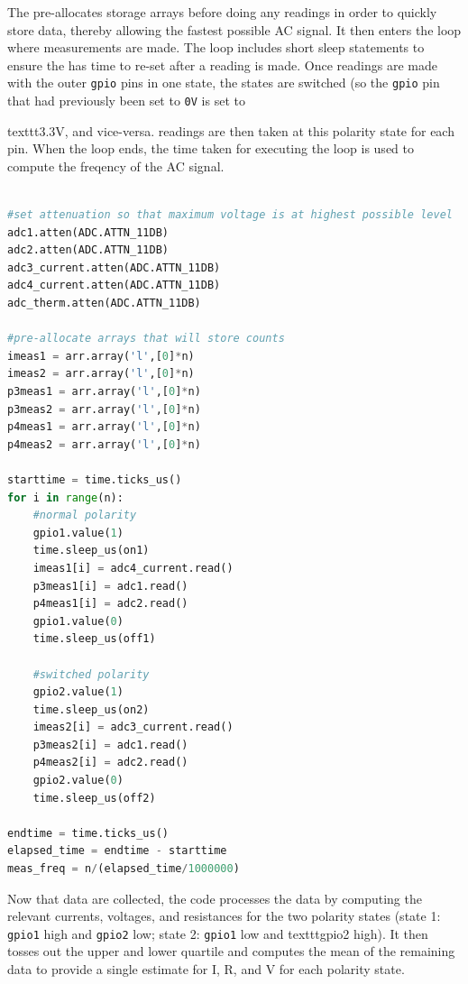 The pre-allocates storage arrays before doing any readings in order to quickly store data, thereby allowing the fastest possible AC signal. It then enters the loop where \adc measurements are made. The loop includes short sleep statements to ensure the \adc has time to re-set after a reading is made. Once readings are made with the outer \texttt{gpio} pins in one state, the states are switched (so the \texttt{gpio} pin that had previously been set to \texttt{0V} is set to {texttt{3.3V}, and vice-versa. \adc readings are then taken at this polarity state for each \adc pin. When the loop ends, the time taken for executing the loop is used to compute the freqency of the AC signal.

\begin{lstlisting}[language=Python]

#set attenuation so that maximum voltage is at highest possible level
adc1.atten(ADC.ATTN_11DB)
adc2.atten(ADC.ATTN_11DB)
adc3_current.atten(ADC.ATTN_11DB)
adc4_current.atten(ADC.ATTN_11DB)
adc_therm.atten(ADC.ATTN_11DB)

#pre-allocate arrays that will store counts
imeas1 = arr.array('l',[0]*n)
imeas2 = arr.array('l',[0]*n)
p3meas1 = arr.array('l',[0]*n)
p3meas2 = arr.array('l',[0]*n)
p4meas1 = arr.array('l',[0]*n)
p4meas2 = arr.array('l',[0]*n)

starttime = time.ticks_us()
for i in range(n):
    #normal polarity
    gpio1.value(1)
    time.sleep_us(on1)
    imeas1[i] = adc4_current.read()
    p3meas1[i] = adc1.read()
    p4meas1[i] = adc2.read()
    gpio1.value(0)
    time.sleep_us(off1)
    
    #switched polarity
    gpio2.value(1)
    time.sleep_us(on2)
    imeas2[i] = adc3_current.read()
    p3meas2[i] = adc1.read()
    p4meas2[i] = adc2.read()
    gpio2.value(0)
    time.sleep_us(off2)
 
endtime = time.ticks_us()
elapsed_time = endtime - starttime
meas_freq = n/(elapsed_time/1000000)

\end{lstlisting}

Now that data are collected, the code processes the data by computing the relevant currents, voltages, and resistances for the two polarity states (state 1: \texttt{gpio1} high and \texttt{gpio2} low; state 2: \texttt{gpio1} low and texttt{gpio2} high). It then tosses out the upper and lower quartile and computes the mean of the remaining data to provide a single estimate for I, R, and V for each polarity state.  

}
